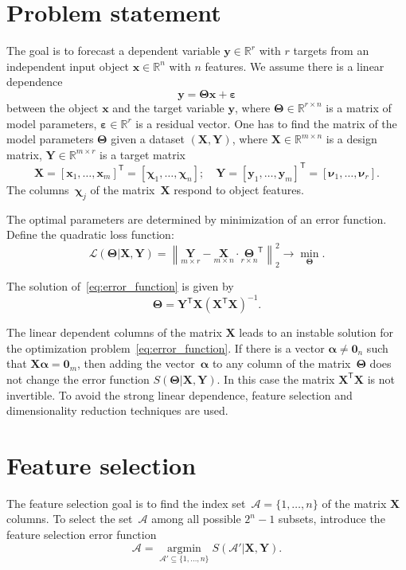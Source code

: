 \documentclass[12pt,twoside]{article}
\theoremstyle{definition}
\newcommand{\bx}{\mathbf{x}}
\newcommand{\by}{\mathbf{y}}
\newcommand{\bY}{\mathbf{Y}}
\newcommand{\bX}{\mathbf{X}}
\newcommand{\bbR}{\mathbb{R}}
\newcommand{\cA}{\mathcal{A}}
\newcommand{\T}{\mathsf{T}}
\newcommand{\bchi}{\boldsymbol{\chi}}
\newcommand{\bnu}{\boldsymbol{\nu}}
\newcommand{\bTheta}{\boldsymbol{\Theta}}
\newcommand{\bZero}{\boldsymbol{0}}
\newcommand{\argmin}{\mathop{\arg \min}\limits}
\begin{document}
\section{Problem statement}
The goal is to forecast a dependent variable $\by \in \bbR^r$ with $r$ targets from an independent input object $\bx \in \bbR^n$ with $n$ features.
We assume there is a linear dependence
\begin{equation}
	\by = \bTheta \bx+ \boldsymbol{\varepsilon}
	\label{eq:model}
\end{equation}
between the object $\bx$ and the target variable $\by$,
where $\bTheta \in \bbR^{r \times n}$ is a matrix of model parameters, $\boldsymbol{\varepsilon} \in \bbR^{r}$ is a residual vector.
One has to find the matrix of the model parameters $\bTheta$ given a dataset $\left( \bX, \bY \right)$, where $\bX \in \bbR^{m \times n}$ is a design matrix, $\bY \in \bbR^{m \times r}$ is a target matrix
\[
	\bX = [\bx_1, \dots, \bx_m]^{\T} =  [\bchi_1, \dots, \bchi_n]; \quad \bY = [\by_1, \dots, \by_m]^{\T} =  [\bnu_1, \dots, \bnu_r].
\]
The columns~$\bchi_j$ of the matrix~$\bX$ respond to object features.

The optimal parameters are determined by minimization of an error function.
Define the quadratic loss function:
\begin{equation}
	\mathcal{L}(\bTheta | \bX, \bY) = {\left\| \underset{m \times r}{\mathbf{Y}}  - \underset{m \times n}{\bX} \cdot \underset{r \times n}{\bTheta}^{\T} \right\| }_2^2 \rightarrow\min_{\bTheta}.
\label{eq:error_function}
\end{equation}

 The solution of~\eqref{eq:error_function} is given by
 \[
 	\bTheta = \bY^{\T} \bX (\bX^{\T} \bX)^{-1}.
 \]

 The linear dependent columns of the matrix $\bX$ leads to an instable solution for the optimization problem~\eqref{eq:error_function}.
 If there is a vector $\boldsymbol{\alpha} \neq \bZero_n$ such that $\bX \boldsymbol{\alpha}= \bZero_m$, then adding the vector~$\boldsymbol{\alpha}$ to any column of the matrix~$\bTheta$ does not change the error function $S(\bTheta | \bX, \bY)$.
 In this case the matrix $\bX^{\T} \bX$ is not invertible.
 To avoid the strong linear dependence, feature selection and dimensionality reduction techniques are used.

 \section{Feature selection}
 The feature selection goal is to find the index set~$\cA = \{1, \dots, n\}$ of the matrix $\bX$ columns. To select the set~$\cA$ among all possible $2^n - 1$ subsets, introduce the feature selection error function
\begin{equation}
	\cA = \argmin_{\cA' \subseteq \{1, \dots, n\}} S(\cA' | \bX, \bY).
	\label{eq:subset_selection}
\end{equation}
\end{document}
